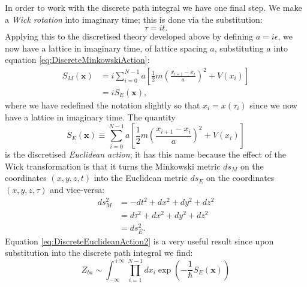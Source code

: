 \documentclass[12pt]{article}
\begin{document}
        In order to work with the discrete path integral we have one final step. We make a \textit{Wick rotation} into imaginary time; this is done via the substitution:
        \begin{equation}
            \label{eq:WickRotation}
            \tau = it.
        \end{equation}
        Applying this to the discretised theory developed above by defining $a=i\epsilon$, we now have a lattice in imaginary time, of lattice spacing $a$, substituting $a$ into equation \ref{eq:DiscreteMinkowskiAction}:
        \begin{align}
            \label{eq:DiscreteEuclideanAction1}
            S_M\left(\bm{x}\right) & = i\sum_{i=0}^{N-1} a \left[\frac{1}{2}m\left(\frac{x_{i+1}-x_{i}}{a}\right)^2 + V(x_i)\right] \\
            \label{eq:DiscreteEuclideanAction2} & = iS_E\left(\bm{x}\right),
        \end{align}
        where we have redefined the notation slightly so that $x_i=x\left(\tau_i\right)$ since we now have a lattice in imaginary time.
        The quantity
        \begin{equation}
            \label{eq:DiscreteEuclideanAction}
            S_{E}\left(\bm{x}\right) \equiv \sum_{i=0}^{N-1} a \left[\frac{1}{2}m\left(\frac{x_{i+1}-x_{i}}{a}\right)^2 + V(x_i)\right]
        \end{equation}
        is the discretised \textit{Euclidean action}; it has this name because the effect of the Wick transformation is that it turns the Minkowski metric $ds_{M}$ on the coordinates $\left(x,y,z,t\right)$ into the Euclidean metric $ds_{E}$ on the coordinates $\left(x,y,z,\tau\right)$ and vice-versa:
        \begin{align}
            \label{eq:MinkowskiMetric} ds_{M}^{2} & = -dt^2 + dx^2 + dy^2 + dz^2 \\
            \label{eq:MetricTransform}            & = d\tau^2 + dx^2 + dy^2 + dz^2 \\
            \label{eq:EuclideanMetric}            & = ds_{E}^{2}.
        \end{align}
        Equation \ref{eq:DiscreteEuclideanAction2} is a very useful result since upon substitution into the discrete path integral we find:
        \begin{equation}
            \label{eq:DiscreteEuclideanPathIntegral}
            Z_{ba} \sim \int^{+\infty}_{-\infty}\prod_{i=1}^{N-1}dx_i \exp{\left(-\frac{1}{\hbar}S_{E}\left(\bm{x}\right)\right)}
        \end{equation}
\end{document}
